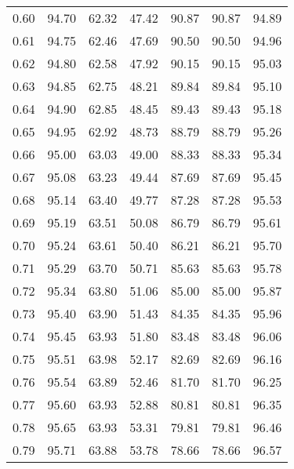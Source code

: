 \begin{tabular}{|c|c|c|c|c|c|c|}
      0.60 &     94.70 &     62.32 &      47.42 &   90.87 &      90.87 &         94.89 \\
      0.61 &     94.75 &     62.46 &      47.69 &   90.50 &      90.50 &         94.96 \\
      0.62 &     94.80 &     62.58 &      47.92 &   90.15 &      90.15 &         95.03 \\
      0.63 &     94.85 &     62.75 &      48.21 &   89.84 &      89.84 &         95.10 \\
      0.64 &     94.90 &     62.85 &      48.45 &   89.43 &      89.43 &         95.18 \\
      0.65 &     94.95 &     62.92 &      48.73 &   88.79 &      88.79 &         95.26 \\
      0.66 &     95.00 &     63.03 &      49.00 &   88.33 &      88.33 &         95.34 \\
      0.67 &     95.08 &     63.23 &      49.44 &   87.69 &      87.69 &         95.45 \\
      0.68 &     95.14 &     63.40 &      49.77 &   87.28 &      87.28 &         95.53 \\
      0.69 &     95.19 &     63.51 &      50.08 &   86.79 &      86.79 &         95.61 \\
      0.70 &     95.24 &     63.61 &      50.40 &   86.21 &      86.21 &         95.70 \\
      0.71 &     95.29 &     63.70 &      50.71 &   85.63 &      85.63 &         95.78 \\
      0.72 &     95.34 &     63.80 &      51.06 &   85.00 &      85.00 &         95.87 \\
      0.73 &     95.40 &     63.90 &      51.43 &   84.35 &      84.35 &         95.96 \\
      0.74 &     95.45 &     63.93 &      51.80 &   83.48 &      83.48 &         96.06 \\
      0.75 &     95.51 &     63.98 &      52.17 &   82.69 &      82.69 &         96.16 \\
      0.76 &     95.54 &     63.89 &      52.46 &   81.70 &      81.70 &         96.25 \\
      0.77 &     95.60 &     63.93 &      52.88 &   80.81 &      80.81 &         96.35 \\
      0.78 &     95.65 &     63.93 &      53.31 &   79.81 &      79.81 &         96.46 \\
      0.79 &     95.71 &     63.88 &      53.78 &   78.66 &      78.66 &         96.57 \\

\end{tabular}
